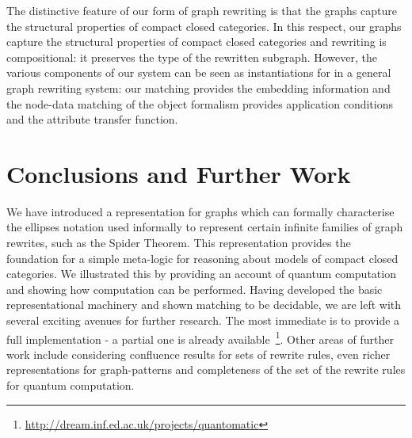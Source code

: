 \documentclass[runningheads]{llncs}
\begin{document}
The distinctive feature of our form of graph rewriting is that the
graphs capture the structural properties of compact closed categories.
In this respect, our graphs capture the structural properties of
compact closed categories and rewriting is compositional: it preserves
the type of the rewritten subgraph. However, the various components of
our system can be seen as instantiations for in a general graph
rewriting system: our matching provides the embedding information and
the node-data matching of the object formalism provides application
conditions and the attribute transfer function.


\section{Conclusions and Further Work}
\label{sec:conclusions}

We have introduced a representation for graphs which can formally
characterise the ellipses notation used informally to represent certain
infinite families of graph rewrites, such as the Spider Theorem. This
representation provides the foundation for a simple meta-logic for
reasoning about models of compact closed categories. We illustrated
this by providing an account of quantum computation and showing how
computation can be performed. Having developed the basic
representational machinery and shown matching to be decidable, we are
left with several exciting avenues for further research. The most
immediate is to provide a full implementation - a partial one is
already
available~\footnote{\url{http://dream.inf.ed.ac.uk/projects/quantomatic}}.
Other areas of further work include considering confluence results for
sets of rewrite rules, even richer representations for graph-patterns
and completeness of the set of the rewrite rules for quantum
computation.




\end{document}
